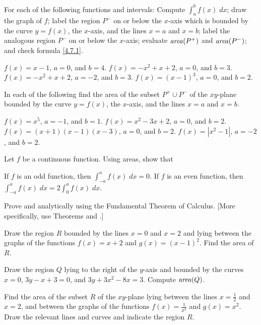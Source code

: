 \begin{exercises}

For each of the following functions and intervals:
Compute $\int_a^b f(x) \; dx$;
draw the graph of $f$;
label the region $P^-$ on or below the $x$-axis
which is bounded by the curve $y = f(x)$,
the $x$-axis, and the lines $x = a$ and $x = b$;
label the analogous region $P^-$ on or below
the $x$-axis;
evaluate $\mbox{\emph{area}}(P^+)$ and
$\mbox{\emph{area}}(P^-)$;
and check formula \eqref{4.7.1}.
\begin{exenum}
\x
$f(x) = x - 1$, $a = 0$, and $b = 4$.
\x
$f(x) = -x^2 + x + 2$, $a = 0$, and $b = 3$.
\x
$f(x) = -x^2 + x + 2$, $a = -2$, and $b = 3$.
\x
$f(x) = (x - 1)^3$, $a = 0$, and $b = 2$.
\end{exenum}

In each of the following find the area of the subset
$P^+ \cup P^-$ of the $xy$-plane bounded by the curve
$y = f(x)$, the $x$-axis, and the lines $x = a$ and $x = b$.
\begin{exenum}
\x
$f(x) = x^5$, $a = -1$, and $b = 1$.
\x
$f(x) = x^2 - 3x + 2$, $a = 0$, and $b = 2$.
\x
$f(x) = (x + 1)(x - 1)(x - 3)$, $a = 0$, and $b = 2$.
\x
$f(x) = |x^2 - 1|$, $a = -2$, and $b = 2$.
\end{exenum}

Let $f$ be a continuous function.
Using areas, show that
\begin{exenum}
\x
{}
If $f$ is an odd function, then
$\int_{-a}^a f(x) \; dx = 0$.
\x
{}
If $f$ is an even function, then
$\int_{-a}^a f(x) \; dx = 2 \int_0^a f(x) \; dx$.
\end{exenum}

Prove  and 
analytically using the Fundamental Theorem of Calculus.
[More specifically, use Theorems 
and .]

Draw the region $R$ bounded by the lines
$x = 0$ and $x = 2$ and lying between the
graphs of the functions $f(x) = x + 2$
and $g(x) = (x - 1)^2$.
Find the area of $R$.

Draw the region $Q$ lying to the right of the $y$-axis
and bounded by the curves $x = 0$, $3y - x + 3 = 0$,
and $3y + 3x^2 - 8x = 3$.
Compute $\mbox{\emph{area}}(Q)$.

Find the area of the subset $R$ of the $xy$-plane
lying between the lines $x = \frac12$ and $x = 2$,
and between the graphs of the functions
$f(x) = \frac1{x^2}$ and $g(x) = x^2$.
Draw the relevant lines and curves and indicate
the region $R$.


\end{exercises}
